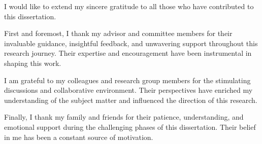 I would like to extend my sincere gratitude to all those who have contributed to this dissertation. 

\vspace{1em}

First and foremost, I thank my advisor and committee members for their invaluable guidance, insightful feedback, and unwavering support throughout this research journey. Their expertise and encouragement have been instrumental in shaping this work.

\vspace{1em}

I am grateful to my colleagues and research group members for the stimulating discussions and collaborative environment. Their perspectives have enriched my understanding of the subject matter and influenced the direction of this research.

\vspace{1em}

Finally, I thank my family and friends for their patience, understanding, and emotional support during the challenging phases of this dissertation. Their belief in me has been a constant source of motivation.
